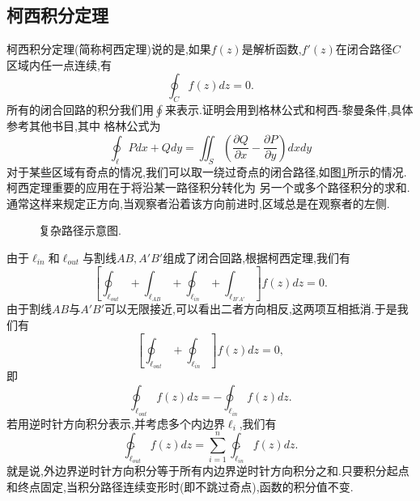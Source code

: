 \subsection{柯西积分定理}
\label{subsec:cauchy_theorem}
柯西积分定理(简称柯西定理)说的是,如果$f(z)$是解析函数,$f'(z)$在闭合路径$C$%
区域内任一点连续,有
\begin{equation}
    \oint_C f(z) dz = 0.
\end{equation}
所有的闭合回路的积分我们用$\oint$来表示.证明会用到格林公式和柯西-黎曼条件,具体参考其他书目,其中
格林公式为
\begin{equation}
    \oint_\ell P dx + Q dy = \iint_S \left( \frac{\partial Q}{\partial x} - \frac{\partial P}{\partial y}  \right) dx dy
\end{equation}
对于某些区域有奇点的情况,我们可以取一绕过奇点的闭合路径,如图\ref{fig:complexregion}所示的情况.柯西定理重要的应用在于将沿某一路径积分转化为
另一个或多个路径积分的求和.通常这样来规定正方向,当观察者沿着该方向前进时,区域总是在观察者的左侧.
\begin{figure}
    \centering
    
    \caption{复杂路径示意图.}
    \label{fig:complexregion}
\end{figure}
由于$\ell_{in}$和$\ell_{out}$与割线$AB,A'B'$组成了闭合回路,根据柯西定理,我们有
\[
    \left[ \oint _{\ell_{out}} + \int _{\ell_{AB}} + \oint _{\ell_{in}} + \int _{\ell_{B'A'}} \right] f(z) dz = 0 .
\]   
由于割线$AB$与$A'B'$可以无限接近,可以看出二者方向相反,这两项互相抵消.于是我们有
\[
    \left[ \oint _{\ell_{out}} + \oint _{\ell_{in}}  \right] f(z) dz = 0,
\]
即
\[
    \oint_{\ell_{out}} f(z) dz = - \oint _{\ell_{in}}f(z) dz .
\]
若用逆时针方向积分表示,并考虑多个内边界$\ell_{i}$,我们有
\begin{equation}
    \ointctrclockwise_{\ell_{out}} f(z) dz = \sum_{i=1}^{n} \ointctrclockwise_{\ell_{in}} f(z) dz .
    \label{eq:cauchy_integral_summation}
\end{equation}
就是说,外边界逆时针方向积分等于所有内边界逆时针方向积分之和.只要积分起点和终点固定,当积分路径连续变形时(即不跳过奇点),函数的积分值不变.

